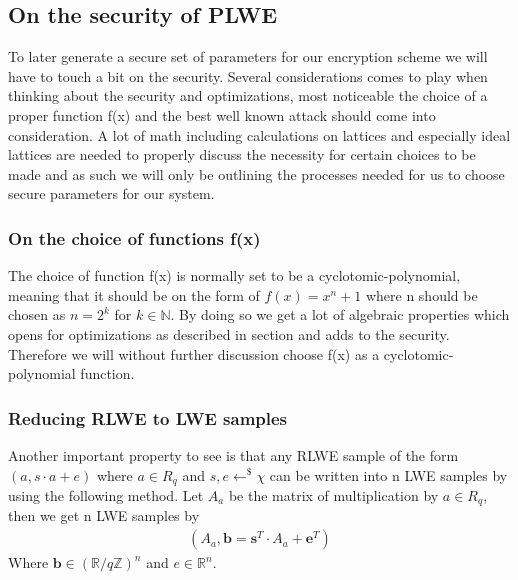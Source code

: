 \documentclass[../main.tex]{subfiles}
\begin{document}
\subsection{On the security of PLWE}
    To later generate a secure set of parameters for our encryption scheme we will have to touch a bit on the security.
    Several considerations comes to play when thinking about the security and optimizations, most noticeable the choice
    of a proper function f(x) and the best well known attack should come into consideration.
    A lot of math including calculations on lattices and especially ideal lattices are needed to properly discuss the
    necessity for certain choices to be made and as such we will only be outlining the processes needed for us to choose
    secure parameters for our system.

    \subsubsection{On the choice of functions f(x)}
        The choice of function f(x) is normally set to be a cyclotomic-polynomial, meaning that it should be on the form
        of $f(x) = x^n + 1$ where n should be chosen as $n = 2^k$ for $k \in \mathbb{N}$.
        By doing so we get a lot of algebraic properties which opens for optimizations as described in section %
        and adds to the security. Therefore we will without further discussion choose f(x) as a cyclotomic-polynomial function.

    \subsubsection{Reducing RLWE to LWE samples}
        Another important property to see is that any RLWE sample of the form $(a, s \cdot a + e)$ 
		where $a \in R_q$ and $s, e \leftarrow^\$ \chi$ can be written into n LWE samples by using the following method.
        Let $A_a$ be the matrix of multiplication by $a \in R_q$, then we get n LWE samples by
        \begin{align*}
            (A_a, \textbf{b} = \textbf{s}^T \cdot A_a + \textbf{e}^T)
        \end{align*}
        Where $\textbf{b} \in (\mathbb{R} / q\mathbb{Z})^n$ and $e \in \mathbb{R}^n$.
\end{document}
